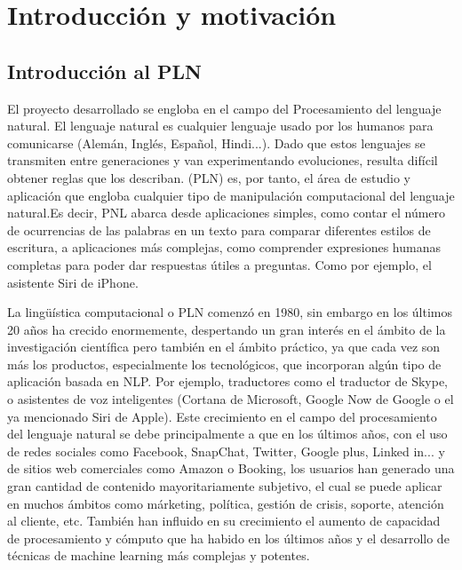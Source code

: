 \chapter{Introducción y motivación}
\label{introducción}
\section{Introducción al PLN}
El proyecto desarrollado se engloba en el campo del Procesamiento del lenguaje natural. El lenguaje natural es cualquier lenguaje usado por los humanos para comunicarse (Alemán, Inglés, Español, Hindi...). Dado que estos lenguajes se transmiten entre generaciones y van experimentando evoluciones, resulta difícil obtener reglas que los describan. (PLN) es, por tanto, el área de estudio y aplicación que engloba cualquier tipo de manipulación computacional del lenguaje natural.\newline Es decir, PNL abarca desde aplicaciones simples, como contar el número de ocurrencias de las palabras en un texto para comparar diferentes estilos de escritura, a aplicaciones más complejas, como comprender expresiones humanas completas para poder dar respuestas útiles a preguntas. \citet{bird2009natural} Como por ejemplo, el asistente Siri de iPhone. 

La lingüística computacional o PLN comenzó en 1980, sin embargo en los últimos 20 años ha crecido enormemente, despertando un gran interés en el ámbito de la investigación científica pero también en el ámbito práctico, ya que cada vez son más los productos, especialmente los tecnológicos, que incorporan algún tipo de aplicación basada en NLP. Por ejemplo, traductores como el traductor de Skype, o asistentes de voz inteligentes (Cortana de Microsoft, Google Now de Google o el ya mencionado Siri de Apple). \newline
Este crecimiento en el campo del procesamiento del lenguaje natural se debe principalmente a que en los últimos años, con el uso de redes sociales como Facebook, SnapChat, Twitter, Google plus, Linked in... y de sitios web comerciales como Amazon o Booking, los usuarios han generado una gran cantidad de contenido mayoritariamente subjetivo, el cual se puede aplicar en muchos ámbitos como márketing, política, gestión de crisis, soporte, atención al cliente, etc. También han influido en su crecimiento el aumento de capacidad de procesamiento y cómputo que ha habido en los últimos años y el desarrollo de técnicas de machine learning más complejas y potentes.    
\newline

